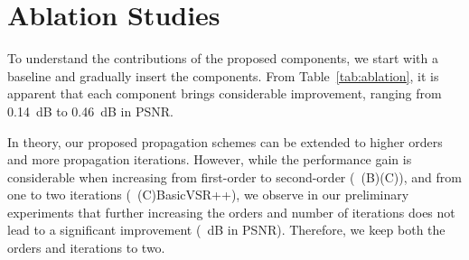 \documentclass[10pt,twocolumn,letterpaper]{article}
\begin{document}
\section{Ablation Studies}
\label{sec:ablation}
To understand the contributions of the proposed components, we start with a baseline and gradually insert the components.
From Table~\ref{tab:ablation}, it is apparent that each component brings considerable improvement, ranging from 0.14~dB to 0.46~dB in PSNR.

In theory, our proposed propagation schemes can be extended to higher orders and more propagation iterations. However, while the performance gain is considerable when increasing from first-order to second-order (\ie~(B)(C)), and from one to two iterations (\ie~(C)BasicVSR++), we observe in our preliminary experiments that further increasing the orders and number of iterations does not lead to a significant improvement (~dB in PSNR). Therefore, we keep both the orders and iterations to two.

\begin{table}[!t]
    \caption{\textbf{Ablation studies of the components.} Each component brings significant improvements in PSNR, verifying their effectiveness.}
    \vspace{-0.4cm}
    \label{tab:ablation}
    \begin{center}
        \tabcolsep=0.13cm
    \end{center}
    \vspace{-0.7cm}
\end{table}
\end{document}
